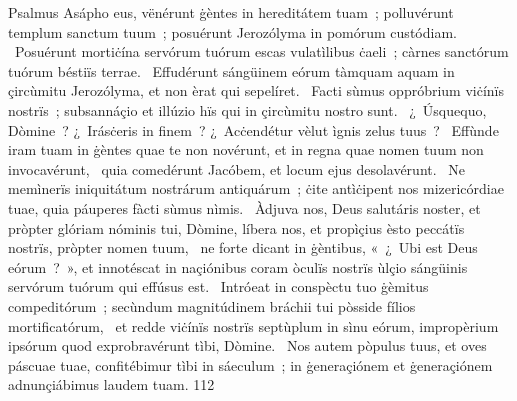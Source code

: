 { Psalmus Asápho}
{%
eus, vënérunt ġèntes in hereditátem tuam~; polluvérunt templum sanctum tuum~; posuérunt Jerozólyma in pomórum custódiam. 
~Posuérunt mortiċína servórum tuórum escas vulatìlibus ċaeli~; càrnes sanctórum tuórum béstiïs terrae. 
~Effudérunt sángüinem eórum tàmquam aquam in çircùmitu Jerozólyma, et non èrat qui sepelíret. 
~Facti sùmus oppróbrium viċínïs nostrïs~; subsannáçio et illúzio hïs qui in çircùmitu nostro sunt. 
~¿~Úsquequo, Dòmine~? ¿~Irásċeris in finem~? ¿~Acċendétur vèlut ìgnis zelus tuus~? 
~Effùnde iram tuam in ġèntes quae te non novérunt, et in regna quae nomen tuum non invocavérunt, 
~quia comedérunt Jacóbem, et locum ejus desolavérunt. 
~Ne memìnerïs iniquitátum nostrárum antiquárum~; ċite antìċipent nos mizericórdiae tuae, quia páuperes fàcti sùmus nìmis. 
~Àdjuva nos, Deus salutáris noster, et pròpter glóriam nóminis tui, Dòmine, líbera nos, et propìçius èsto peccátïs nostrïs, pròpter nomen tuum, 
~ne forte dicant in ġèntibus, «~¿~Ubi est Deus eórum~?~», et innotéscat in naçiónibus coram òculïs nostrïs ùlçio sángüinis servórum tuórum qui effúsus est. 
~Intróeat in conspèctu tuo ġèmitus compeditórum~; secùndum magnitúdinem bráchii tui pòsside fílios mortificatórum, 
~et redde viċínïs nostrïs septùplum in sìnu eórum, impropèrium ipsórum quod exprobravérunt tìbi, Dòmine. 
~Nos autem pòpulus tuus, et oves páscuae tuae, confitébimur tìbi in sáeculum~; in ġeneraçiónem et ġeneraçiónem adnunçiábimus laudem tuam. 
}
{11}{2}
